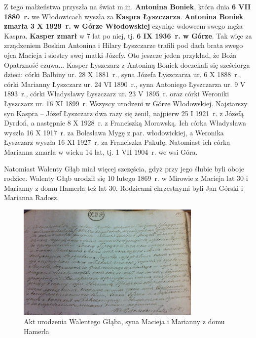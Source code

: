 Z tego małżeństwa przyszła na świat m.in. \textbf{Antonina Boniek}, która dnia \textbf{6 VII 1880~r.} we Włodowicach wyszła za \textbf{Kaspra Łyszczarza}. \textbf{Antonina Boniek zmarła 3 X 1929~r. w Górze Włodowskiej} czyniąc wdowcem swego męża Kaspra. \textbf{Kasper zmarł} w 7 lat po niej, tj. \textbf{6 IX 1936~r. w Górze}. Tak więc za zrządzeniem Boskim Antonina i Hilary Łyszczarze trafili pod dach brata swego ojca Macieja i siostry swej matki Józefy. Oto jeszcze jeden przykład, że Boża Opatrzność czuwa... Kasper Łyszczarz z Antoniną Boniek doczekali się sześciorga dzieci: córki Balbiny ur. 28 X 1881~r., syna Józefa Łyszczarza ur. 6 X 1888~r., córki Marianny Łyszczarz ur. 24 VI 1890~r., syna Antoniego Łyszczarza ur. 9 V 1893~r., córki Władysławy Łyszczarz ur. 23 V 1895~r. oraz córki Weroniki Łyszczarz ur. 16 XI 1899~r. Wszyscy urodzeni w Górze Włodowskiej. Najstarszy syn Kaspra -- Józef Łyszczarz dwa razy się żenił, najpierw 25 I 1921~r. z Józefą Dyrdoń, a następnie 8 X 1928~r. z Franciszką Morawską. Ich córka Władysława wyszła 16 X 1917~r. za Bolesława Mygę  z par. włodowickiej, a Weronika Łyszczarz wyszła 16 XI 1927~r. za Franciszka Pakułę. Natomiast ich córka Marianna zmarła w wieku 14 lat, tj. 1 VII 1904~r. we wsi Góra.

Natomiast Walenty Głąb miał więcej szczęścia, gdyż przy jego ślubie byli oboje rodzice. Walenty Głąb urodził się 10 lutego 1869~r. w Mirowie z Macieja lat 30 i Marianny z domu Hamerla też lat 30. Rodzicami chrzestnymi byli Jan Górski i Marianna Radosz.

\begin{figure}[!h]
\begin{center}
\includegraphics[width=0.8\textwidth]{zdjecia/akt_urodzenia_walentego_glaba.jpg}
\caption[Akt urodzenia Walentego Głąba]{Akt urodzenia Walentego Głąba, syna Macieja i Marianny z domu Hamerla}
\label{rys:akt_urodzenia_walentego_glaba}
\end{center}
\end{figure}

